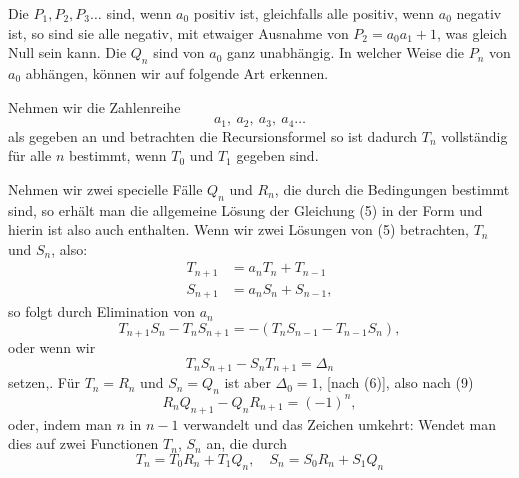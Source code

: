 
Die $P_1, P_2, P_3 \ldots$ sind, wenn $a_0$ positiv ist, gleichfalls alle positiv, wenn $a_0$ negativ ist, so sind sie alle negativ, mit etwaiger Ausnahme von $P_2 = a_0 a_1 + 1$, was gleich Null sein kann. Die $Q_n$ sind von $a_0$ ganz unabh\"angig. In welcher Weise die $P_n$ von $a_0$ abh\"angen, k\"onnen wir auf folgende Art erkennen.

Nehmen wir die Zahlenreihe
\[
a_1, \ a_2, \ a_3, \ a_4 \ldots
\]
als gegeben an und betrachten die Recursionsformel
so ist dadurch $T_n$ vollst\"andig f\"ur alle $n$ bestimmt, wenn $T_0$ und $T_1$ gegeben sind.

Nehmen wir zwei specielle F\"alle $Q_n$ und $R_n$, die durch die Bedingungen
bestimmt sind, so erh\"alt man die allgemeine L\"osung der Gleichung (5) in der Form
und hierin ist also auch
enthalten. Wenn wir zwei L\"osungen von (5) betrachten, $T_n$ und $S_n$, also:
\[
\begin{aligned}
T_{n+1} &= a_n T_n + T_{n-1} \\
S_{n+1} &= a_n S_n + S_{n-1},
\end{aligned}
\]
so folgt durch Elimination von $a_n$
\[
T_{n+1} S_n - T_n S_{n+1} = -(T_n S_{n-1} - T_{n-1} S_n),
\]
oder wenn wir
\[
T_n S_{n+1} - S_n T_{n+1} = \varDelta_n
\]
setzen,. %
F\"ur $T_n = R_n$ und $S_n = Q_n$ ist aber $\varDelta_0 = 1$, [nach (6)], also nach (9)
\[
R_n Q_{n+1} - Q_n R_{n+1} = (-1)^n,
\]
oder, indem man $n$ in $n-1$ verwandelt und das Zeichen umkehrt:
Wendet man dies auf zwei Functionen $T_n$, $S_n$ an, die durch
\[
T_n = T_0 R_n + T_1 Q_n, \quad S_n = S_0 R_n + S_1 Q_n
\]
